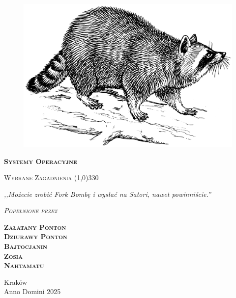 \begin{titlepage}
	\begin{center}
		\begin{figure}[h]
			\centering
			\includegraphics[scale=0.8]{img/raccoon.png}
		\end{figure}

		\Huge
		\textbf{\textsc{Systemy Operacyjne}}

		\vspace{0.5cm}
		\Large
		\textsc{Wybrane Zagadnienia}
		\line(1,0){330}

		\normalsize

		\vspace{1cm}
		\textit{,,Możecie zrobić Fork Bombę i wysłać na Satori, nawet powinniście.''}
		\vspace{1cm}

		\textit{\textsc{Popełnione przez}}\\
		\vspace{5mm}

		\textbf{\textsc{Załatany Ponton\\ Dziurawy Ponton \\Bajtocjanin \\ Zosia \\ Nahtamatu}}

		\vfill

		Kraków \\
		Anno Domini 2025
	\end{center}
\end{titlepage}
